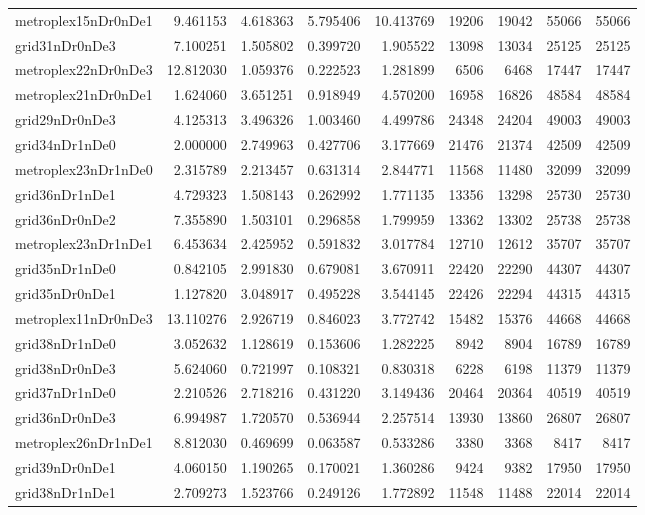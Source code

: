 \begin{longtable}{|l|r|r|r|r|r|r|r|r|}
metroplex15nDr0nDe1 & 9.461153 & 4.618363 & 5.795406 & 10.413769 & 19206 & 19042 & 55066 & 55066 \\
grid31nDr0nDe3 & 7.100251 & 1.505802 & 0.399720 & 1.905522 & 13098 & 13034 & 25125 & 25125 \\
metroplex22nDr0nDe3 & 12.812030 & 1.059376 & 0.222523 & 1.281899 & 6506 & 6468 & 17447 & 17447 \\
metroplex21nDr0nDe1 & 1.624060 & 3.651251 & 0.918949 & 4.570200 & 16958 & 16826 & 48584 & 48584 \\
grid29nDr0nDe3 & 4.125313 & 3.496326 & 1.003460 & 4.499786 & 24348 & 24204 & 49003 & 49003 \\
grid34nDr1nDe0 & 2.000000 & 2.749963 & 0.427706 & 3.177669 & 21476 & 21374 & 42509 & 42509 \\
metroplex23nDr1nDe0 & 2.315789 & 2.213457 & 0.631314 & 2.844771 & 11568 & 11480 & 32099 & 32099 \\
grid36nDr1nDe1 & 4.729323 & 1.508143 & 0.262992 & 1.771135 & 13356 & 13298 & 25730 & 25730 \\
grid36nDr0nDe2 & 7.355890 & 1.503101 & 0.296858 & 1.799959 & 13362 & 13302 & 25738 & 25738 \\
metroplex23nDr1nDe1 & 6.453634 & 2.425952 & 0.591832 & 3.017784 & 12710 & 12612 & 35707 & 35707 \\
grid35nDr1nDe0 & 0.842105 & 2.991830 & 0.679081 & 3.670911 & 22420 & 22290 & 44307 & 44307 \\
grid35nDr0nDe1 & 1.127820 & 3.048917 & 0.495228 & 3.544145 & 22426 & 22294 & 44315 & 44315 \\
metroplex11nDr0nDe3 & 13.110276 & 2.926719 & 0.846023 & 3.772742 & 15482 & 15376 & 44668 & 44668 \\
grid38nDr1nDe0 & 3.052632 & 1.128619 & 0.153606 & 1.282225 & 8942 & 8904 & 16789 & 16789 \\
grid38nDr0nDe3 & 5.624060 & 0.721997 & 0.108321 & 0.830318 & 6228 & 6198 & 11379 & 11379 \\
grid37nDr1nDe0 & 2.210526 & 2.718216 & 0.431220 & 3.149436 & 20464 & 20364 & 40519 & 40519 \\
grid36nDr0nDe3 & 6.994987 & 1.720570 & 0.536944 & 2.257514 & 13930 & 13860 & 26807 & 26807 \\
metroplex26nDr1nDe1 & 8.812030 & 0.469699 & 0.063587 & 0.533286 & 3380 & 3368 & 8417 & 8417 \\
grid39nDr0nDe1 & 4.060150 & 1.190265 & 0.170021 & 1.360286 & 9424 & 9382 & 17950 & 17950 \\
grid38nDr1nDe1 & 2.709273 & 1.523766 & 0.249126 & 1.772892 & 11548 & 11488 & 22014 & 22014 \\

\end{longtable}
